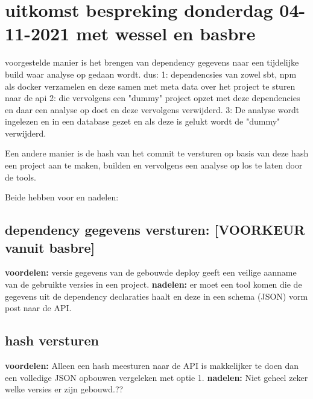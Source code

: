 \section{uitkomst bespreking donderdag 04-11-2021 met wessel en basbre}\label{sec:uitkomst-bespreking-donderdag-04-11-2021-met-wessel-en-basbre}

voorgestelde manier is het brengen van dependency gegevens naar een tijdelijke build waar analyse op gedaan wordt. dus: 1: dependencsies van zowel sbt, npm als docker verzamelen en deze samen met meta data over het project te sturen naar de api  2: die vervolgens een "dummy" project opzet met deze dependencies en daar een analyse op doet en deze vervolgens verwijderd. 3: De analyse wordt ingelezen en in een database gezet en als deze is gelukt wordt de "dummy" verwijderd.

Een andere manier is de hash van het commit te versturen op basis van deze hash een project aan te maken, builden en vervolgens een analyse op los te laten door de tools.

Beide hebben voor en nadelen:

\subsection{dependency gegevens versturen: [VOORKEUR vanuit basbre]}\label{subsec:dependency-gegevens-versturen:-[voorkeur-vanuit-basbre]}
\textbf{voordelen:}
versie gegevens van de gebouwde deploy geeft een veilige aanname van de gebruikte versies in een project.
\textbf{nadelen:}
er moet een tool komen die de gegevens uit de dependency declaraties haalt en deze in een schema (JSON) vorm post naar de API\@.

\subsection{hash versturen}\label{subsec:hash-versturen}
\textbf{voordelen:}
Alleen een hash meesturen naar de API is makkelijker te doen dan een volledige JSON opbouwen vergeleken met optie 1.
\textbf{nadelen:}
Niet geheel zeker welke versies er zijn gebouwd.??

